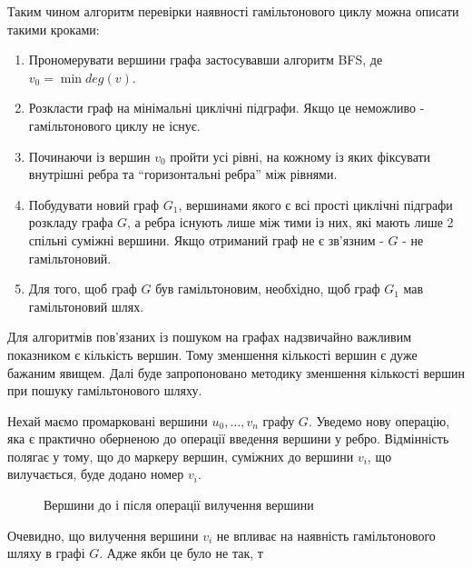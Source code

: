 \documentclass[a4paper,14pt,ukrainian]{extarticle}
\begin{document}
    Таким чином алгоритм перевірки наявності гамільтонового циклу можна описати такими кроками:
    \begin{enumerate}
        \item Прономерувати вершини графа застосувавши алгоритм BFS, де $v_0 = \min{deg(v)}$.
        \item Розкласти граф на мінімальні циклічні підграфи.
            Якщо це неможливо - гамільтонового циклу не існує.
        \item Починаючи із вершин $v_0$ пройти усі рівні, на кожному із яких фіксувати внутрішні ребра та ``горизонтальні ребра'' між рівнями.
        \item Побудувати новий граф $G_1$, вершинами якого є всі прості циклічні підграфи розкладу графа $G$, а ребра існують лише між тими із них, які мають лише 2 спільні суміжні вершини.
            Якщо отриманий граф не є зв’язним - $G$ - не гамільтоновий.
        \item Для того, щоб граф $G$ був гамільтоновим, необхідно, щоб граф $G_1$ мав гамільтоновий шлях.

    \end{enumerate}

    Для алгоритмів пов’язаних із пошуком на графах надзвичайно важливим показником є кількість вершин.
    Тому зменшення кількості вершин є дуже бажаним явищем.
    Далі буде запропоновано методику зменшення кількості вершин при пошуку гамільтонового шляху.

    Нехай маємо промарковані вершини $u_0, \dots , v_n$ графу $G$.
    Уведемо нову операцію, яка є практично оберненою до операції введення вершини у ребро.
    Відмінність полягає у тому, що до маркеру вершин, суміжних до вершини $v_i$, що вилучається, буде додано номер $v_i$.
    \begin{figure}[h]
        \caption{Вершини до і після операції вилучення вершини}
        \centering
        \hspace{2cm}
    \end{figure}

    Очевидно, що вилучення вершини $v_i$ не впливає на наявність гамільтонового шляху в графі $G$.
    Адже якби це було не так, т
\end{document}
